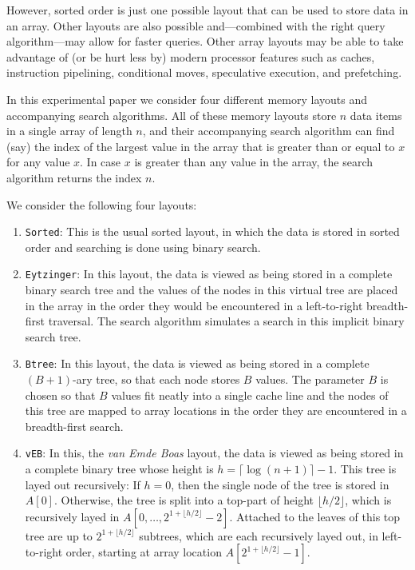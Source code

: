 \documentclass{patmorin}
\begin{document}
However, sorted order is just one possible layout that can be used to
store data in an array. Other layouts are also possible and---combined
with the right query algorithm---may allow for faster queries.
Other array layouts may be able to take advantage of (or be hurt less
by) modern processor features such as caches, instruction pipelining,
conditional moves, speculative execution, and prefetching.

In this experimental paper we consider four different memory layouts and
accompanying search algorithms.  All of these memory layouts store $n$
data items in a single array of length $n$, and their accompanying search
algorithm can find (say) the index of the largest value in the array that
is greater than or equal to $x$ for any value $x$. In case $x$ is greater
than any value in the array, the search algorithm returns the index $n$.

We consider the following four layouts:

\begin{enumerate}
  \item \texttt{Sorted}:  This is the usual sorted layout, in which
  the data is stored in sorted order and searching is done using binary
  search.

  \item \texttt{Eytzinger}: In this layout, the data is viewed as being
  stored in a complete binary search tree and the values of the nodes
  in this virtual tree are placed in the array in the order they would
  be encountered in a left-to-right breadth-first traversal.  The search
  algorithm simulates a search in this implicit binary search tree.


  \item \texttt{Btree}: In this layout, the data is viewed as being stored
  in a complete $(B+1)$-ary tree, so that each node stores $B$ values.
  The parameter $B$ is chosen so that $B$ values fit neatly into a single
  cache line and the nodes of this tree are mapped to array locations in
  the order they are encountered in a breadth-first search.


  \item \texttt{vEB}: In this, the \emph{van Emde Boas} layout,
  the data is viewed as being stored in a complete binary tree
  whose height is $h=\lceil\log (n+1)\rceil -1$. This tree is layed
  out recursively:  If $h=0$, then the single node of the tree is
  stored in $A[0]$.  Otherwise, the tree is split into a top-part
  of height $\lfloor h/2\rfloor$, which is recursively layed in
  $A[0,\ldots,2^{1+\lfloor{h/2\rfloor}}-2]$.  Attached to the leaves of
  this top tree are up to $2^{1+\lfloor{h/2\rfloor}}$ subtrees, which
  are each recursively layed out, in left-to-right order, starting at
  array location $A[2^{1+\lfloor{h/2\rfloor}}-1]$.
\end{enumerate}
\end{document}
